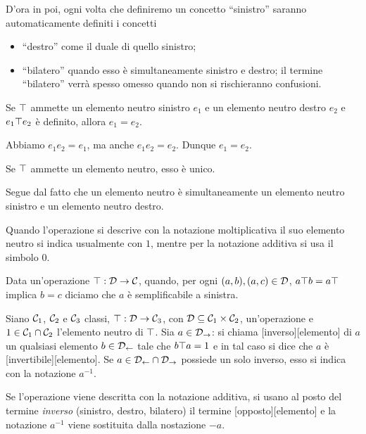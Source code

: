 \par D'ora in poi, ogni volta che definiremo un concetto ``sinistro'' saranno automaticamente definiti i concetti
\begin{itemize}
	\item ``destro'' come il duale di quello sinistro;
	\item ``bilatero'' quando esso \`e simultaneamente sinistro e destro; il termine ``bilatero'' verr\`a spesso omesso quando non si rischieranno confusioni.
\end{itemize}
\begin{Theorem}
	Se $\top$ ammette un elemento neutro sinistro $e_1$ e un elemento neutro destro $e_2$ e $e_1 \top e_2$ \`e definito, allora $e_1 = e_2$.
\end{Theorem}
\Proof Abbiamo $e_1 e_2 = e_1$, ma anche $e_1 e_2 = e_2$. Dunque $e_1 = e_2$. \EndProof
\begin{Corollary}
	Se $\top$ ammette un elemento neutro, esso \`e unico.
\end{Corollary}
\Proof Segue dal fatto che un elemento neutro \`e simultaneamente un elemento neutro sinistro e un elemento neutro destro. \EndProof
\par Quando l'operazione si descrive con la notazione moltiplicativa il suo elemento neutro si indica usualmente con $1$, mentre per la notazione additiva si usa il simbolo $0$.
\begin{Definition}
	Data un'operazione $\top: \mathcal{D} \rightarrow \mathcal{C}$, quando, per ogni $(a,b), (a,c) \in \mathcal{D}$, $a \top b = a \top$ implica $b = c$ diciamo che $a$ \`e semplificabile a sinistra.
\end{Definition}
\begin{Definition}
	Siano $\mathcal{C}_1$, $\mathcal{C}_2$ e $\mathcal{C}_3$ classi, $\top: \mathcal{D} \rightarrow \mathcal{C}_3$, con $\mathcal{D} \subseteq \mathcal{C}_1 \times \mathcal{C}_2$, un'operazione e $1 \in \mathcal{C}_1 \cap \mathcal{C}_2$ l'elemento neutro di $\top$. Sia $a \in \mathcal{D}_\rightarrow$: si chiama [inverso][elemento] di $a$ un qualsiasi elemento $b \in \mathcal{D}_\leftarrow$ tale che $b \top a = 1$ e in tal caso si dice che $a$ \`e [invertibile][elemento]. Se $a \in \mathcal{D}_\leftarrow \cap \mathcal{D}_\rightarrow$ possiede un solo inverso, esso si indica con la notazione $a^{-1}$.
\end{Definition}
\par Se l'operazione viene descritta con la notazione additiva, si usano al posto del termine \emph{inverso} (sinistro, destro, bilatero) il termine [opposto][elemento] e la notazione $a^{-1}$ viene sostituita dalla nostazione $- a$.
